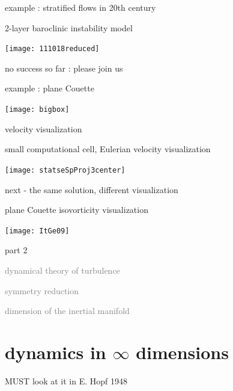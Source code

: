 \begin{frame}{example : stratified flows in 20th century}
\begin{block}{2-layer baroclinic instability model}
\begin{center}
\texttt{[image: 111018reduced]}
\end{center}
\end{block}
no success so far : please join us
\end{frame}

\begin{frame}{example : plane Couette}
\begin{center}
\texttt{[image: bigbox]}
\end{center}
velocity visualization
\end{frame}

\begin{frame}{small computational cell, Eulerian velocity visualization}
\begin{center}
\texttt{[image: statseSpProj3center]}
\end{center}
next - the same solution, different visualization
\end{frame}

\begin{frame}{plane Couette isovorticity visualization}
\begin{center}
\texttt{[image: ItGe09]}
\end{center}
\end{frame}


\begin{frame}{part 2}
\begin{enumerate}
              \item
    \textcolor{gray}{\small
dynamical theory of turbulence
        }
              \item
    {\Large
\statesp
    }\textcolor{gray}{\small
              \item
symmetry reduction
              \item
dimension of the inertial manifold
                    }
            \end{enumerate}
\end{frame}


\section[dynamics in $\infty$ dimensions]
{dynamics in $\infty$ dimensions}

\begin{frame}{{\Large MUST} look at it in}
\bigskip
\hfill
{\Huge \statesp}
\vfill
E. Hopf 1948
\end{frame}


